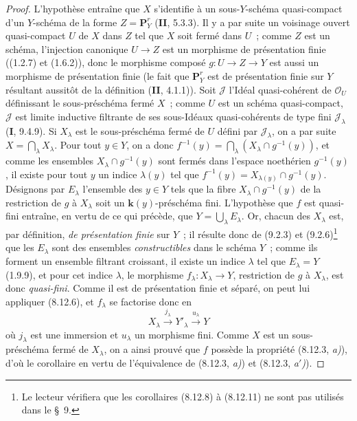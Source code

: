 \begin{proof}
L'hypothèse entraîne que $X$ s'identifie à un sous-$Y$-schéma quasi-compact
d'un $Y$-schéma de la forme $Z=\mathbf P_Y^r$ (\textbf{II}, 5.3.3). Il y a par suite
un voisinage ouvert quasi-compact $U$ de $X$ dans $Z$ tel que $X$ soit fermé
dans $U$~; comme $Z$ est un schéma, l'injection canonique $U\to Z$ est un
morphisme de présentation finie ((1.2.7) et (1.6.2)), donc le morphisme
composé $g:U\to Z\to Y$ est aussi un morphisme de présentation finie (le
fait que $\mathbf P_Y^r$ est de présentation finie sur $Y$ résultant
aussitôt de la définition (\textbf{II}, 4.1.1)). Soit $\mathcal J$ l'Idéal
quasi-cohérent de $\mathcal O_U$ définissant le sous-préschéma fermé $X$~;
comme $U$ est un schéma quasi-compact, $\mathcal J$ est limite inductive
filtrante de ses sous-Idéaux quasi-cohérents de type fini $\mathcal J_\lambda$
(\textbf{I}, 9.4.9). Si $X_\lambda$ est le sous-préschéma fermé de $U$ défini par
$\mathcal J_\lambda$, on a par suite $X=\bigcap_\lambda X_\lambda$. Pour tout
$y\in Y$, on a donc
$f^{-1}(y)=\bigcap_\lambda(X_\lambda\cap g^{-1}(y))$, et comme les ensembles
$X_\lambda\cap g^{-1}(y)$ sont fermés dans l'espace noethérien
$g^{-1}(y)$, il existe pour tout $y$ un indice $\lambda(y)$ tel que
$f^{-1}(y)=X_{\lambda(y)}\cap g^{-1}(y)$. Désignons par $E_\lambda$
l'ensemble des $y\in Y$ tels que la fibre $X_\lambda\cap g^{-1}(y)$ de la
restriction de $g$ à $X_\lambda$ soit un $\boldsymbol{k}(y)$-préschéma fini. L'hypothèse
que $f$ est quasi-fini entraîne, en vertu de ce qui précède, que
$Y=\bigcup_\lambda E_\lambda$. Or, chacun des $X_\lambda$ est, par
définition, \emph{de présentation finie} sur $Y$~; il résulte donc de
(9.2.3) et (9.2.6)\footnote{Le lecteur vérifiera que les corollaires (8.12.8)
à (8.12.11) ne sont pas utilisés dans le \S~9.} que les $E_\lambda$ sont des
ensembles \emph{constructibles} dans le schéma $Y$~; comme ils forment un
ensemble filtrant croissant, il existe un indice $\lambda$ tel que
$E_\lambda=Y$ (1.9.9), et pour cet indice $\lambda$, le morphisme
$f_\lambda:X_\lambda\to Y$, restriction de $g$ à $X_\lambda$, est donc
\emph{quasi-fini}. Comme il est de présentation finie et séparé, on peut lui
appliquer (8.12.6), et $f_\lambda$ se factorise donc en
\[
X_\lambda\xrightarrow{j_\lambda}Y'_\lambda
\xrightarrow{u_\lambda}Y
\]
où $j_\lambda$ est une immersion et $u_\lambda$ un morphisme fini. Comme
$X$ est un sous-préschéma fermé de $X_\lambda$, on a ainsi prouvé que $f$
possède la propriété (8.12.3, \emph{a)}), d'où le corollaire en vertu de
l'équivalence de (8.12.3, \emph{a)}) et (8.12.3, \emph{a$'$)}).
\end{proof}

